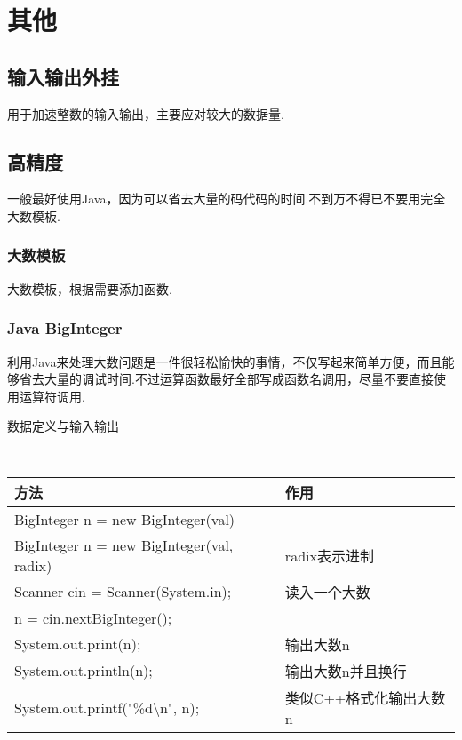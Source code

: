 \clearpage\chapter{其他}

\section{输入输出外挂}\small
用于加速整数的输入输出，主要应对较大的数据量.



\section{高精度}\small
一般最好使用Java，因为可以省去大量的码代码的时间.不到万不得已不要用完全
大数模板.


    \subsection{大数模板}\small
大数模板，根据需要添加函数.



    \subsection{Java BigInteger}\small
利用Java来处理大数问题是一件很轻松愉快的事情，不仅写起来简单方便，而且能
够省去大量的调试时间.不过运算函数最好全部写成函数名调用，尽量不要直接使
用运算符调用.

数据定义与输入输出
{\tt
    \begin{longtable}{|p{9.3cm}|p{6cm}|}
    \hline
    方法 & 作用 \\
    \hline
    BigInteger n = new BigInteger(val) & \\
    \hline
    BigInteger n = new BigInteger(val, radix) & radix表示进制 \\
    \hline
    Scanner cin = Scanner(System.in); & 读入一个大数 \\
    n = cin.nextBigInteger(); & \\
    \hline
    System.out.print(n); & 输出大数n \\
    \hline
    System.out.println(n); & 输出大数n并且换行 \\
    \hline
    System.out.printf("\%d\textbackslash n", n); & 类似C++格式化输出大数n \\
    \hline
    \end{longtable}
}

